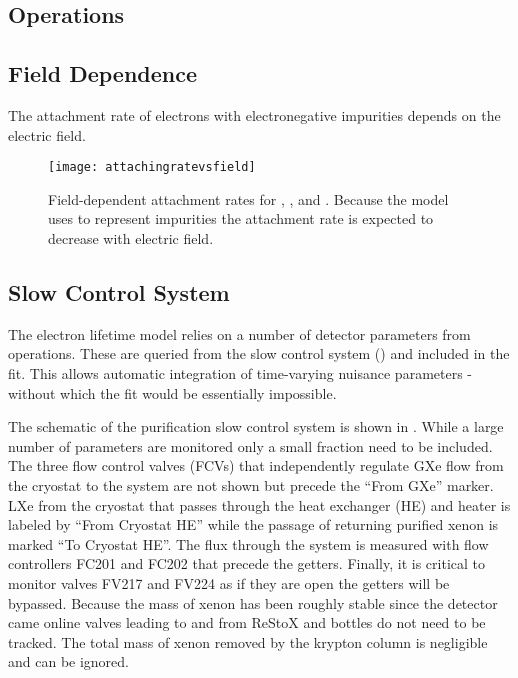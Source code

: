 {\subsection{Operations}
\label{subsec:electron_lifetime_model_ops}



\subsection{Field Dependence}
\label{subsec:electron_lifetime_model_field}
The attachment rate of electrons with electronegative impurities depends on the electric field.

\begin{figure}
\centering
\texttt{[image: attachingratevsfield]}
\caption{Field-dependent attachment rates for , , and .  Because the model uses  to represent
impurities the attachment rate is expected to decrease with electric field.}
\label{fig:electron_lifetime_model_field_attaching_rate}
\end{figure}



\subsection{Slow Control System}
\label{subsec:electron_lifetime_model_slow_control}
The electron lifetime model relies on a number of detector parameters from operations.  These are queried from the slow control system
() and included in the fit.  This allows automatic integration of time-varying nuisance
parameters - without which the fit would be essentially impossible.

The schematic of the purification slow control system is shown in .  While a large
number of parameters are monitored only a small fraction need to be included.  The three flow control valves (FCVs) that independently
regulate GXe flow from the cryostat to the system are not shown but precede the ``From GXe'' marker.  LXe from the cryostat that passes
through the heat exchanger (HE) and heater is labeled by ``From Cryostat HE'' while the passage of returning purified xenon is marked
``To Cryostat HE''.  The flux through the system is
measured with flow controllers FC201 and FC202 that precede the getters.  Finally, it is critical to monitor valves FV217 and FV224 as
if they are open the getters will be bypassed.  Because the mass of xenon has been roughly stable since the detector came online valves
leading to and from ReStoX and bottles do not need to be tracked.  The total mass of xenon removed by the krypton column is negligible and
can be ignored.

}
